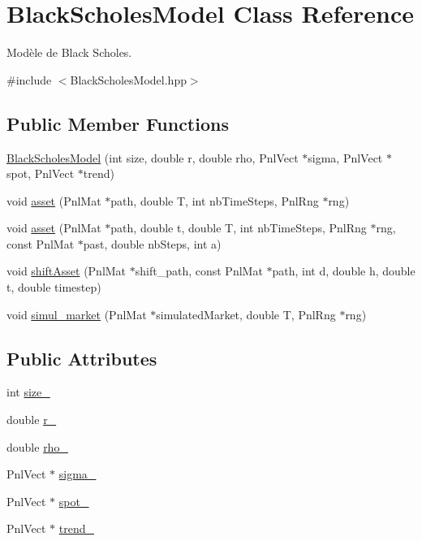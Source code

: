\hypertarget{classBlackScholesModel}{\section{Black\-Scholes\-Model Class Reference}
\label{classBlackScholesModel}
}


Modèle de Black Scholes.  




{\ttfamily \#include $<$Black\-Scholes\-Model.\-hpp$>$}

\subsection*{Public Member Functions}
\begin{DoxyCompactItemize}
\item 
\hyperlink{classBlackScholesModel_a803b1ad2cd281d16f0ac66145dbdc9f3}{Black\-Scholes\-Model} (int size, double r, double rho, Pnl\-Vect $\ast$sigma, Pnl\-Vect $\ast$spot, Pnl\-Vect $\ast$trend)
\item 
void \hyperlink{classBlackScholesModel_a71ed54a0ca9a89b87610ff699814e120}{asset} (Pnl\-Mat $\ast$path, double T, int nb\-Time\-Steps, Pnl\-Rng $\ast$rng)
\item 
void \hyperlink{classBlackScholesModel_a9b2fb8790c28edca5d47c712133af14f}{asset} (Pnl\-Mat $\ast$path, double t, double T, int nb\-Time\-Steps, Pnl\-Rng $\ast$rng, const Pnl\-Mat $\ast$past, double nb\-Steps, int a)
\item 
void \hyperlink{classBlackScholesModel_ac89a165e6d27cc12dd77627597f7f56d}{shift\-Asset} (Pnl\-Mat $\ast$shift\-\_\-path, const Pnl\-Mat $\ast$path, int d, double h, double t, double timestep)
\item 
void \hyperlink{classBlackScholesModel_affbc621fa8678a7aa9aa4699f27f5258}{simul\-\_\-market} (Pnl\-Mat $\ast$simulated\-Market, double T, Pnl\-Rng $\ast$rng)
\end{DoxyCompactItemize}
\subsection*{Public Attributes}
\begin{DoxyCompactItemize}
\item 
int \hyperlink{classBlackScholesModel_ab84e9318c0c1e8a50d5e2f9a70f1256e}{size\-\_\-}
\item 
double \hyperlink{classBlackScholesModel_a9b07eb1d8a7ada20e1a723ba19172644}{r\-\_\-}
\item 
double \hyperlink{classBlackScholesModel_a1022a65929e3656f8990b7b0a63705ba}{rho\-\_\-}
\item 
Pnl\-Vect $\ast$ \hyperlink{classBlackScholesModel_a745a2d85da5056b44bd88f37ee7b33e0}{sigma\-\_\-}
\item 
Pnl\-Vect $\ast$ \hyperlink{classBlackScholesModel_a6ce6853d5f0d65c8e0f07cdedca3e26a}{spot\-\_\-}
\item 
Pnl\-Vect $\ast$ \hyperlink{classBlackScholesModel_af92b535c61f17e7a16af56952739302f}{trend\-\_\-}
\end{DoxyCompactItemize}


